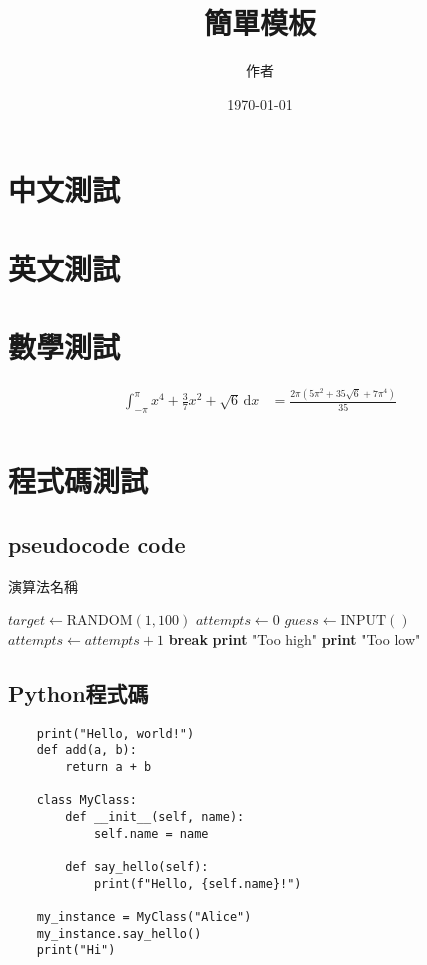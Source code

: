 \documentclass[12pt]{article}
\title{簡單模板}
\author{作者}
\date{\today}
\begin{document}
\maketitle
\tableofcontents

\section{中文測試}
\zhlipsum[1]
\section{英文測試}
\lipsum[1]
\section{數學測試}
\begin{align}
	\int_{-\pi }^{\pi } x^{4} + \frac{3}{7}x^2 + \sqrt{6}   \,\mathrm{d}x & = \frac{2 \pi (5 \pi^{2} + 35 \sqrt{6} + 7 \pi^{4})}{35} \\
\end{align}
\section{程式碼測試}
\subsection{pseudocode code}
\begin{algorithm}
	\caption{演算法名稱}
	\begin{algorithmic}[1]
		\State \(target \gets \text{RANDOM}(1, 100) \)
		\State \(attempts \gets 0\)
		\State \(guess \gets \text{INPUT}() \)
		\State \(attempts \gets attempts + 1\)
		\State \textbf{break}
		\State \textbf{print} "Too high"
		\Else
		\State \textbf{print} "Too low"
		\EndIf
		\EndWhile
	\end{algorithmic}
\end{algorithm}

\subsection{Python程式碼}
\begin{verbatim}
    print("Hello, world!")
    def add(a, b):
        return a + b

    class MyClass:
        def __init__(self, name):
            self.name = name

        def say_hello(self):
            print(f"Hello, {self.name}!")

    my_instance = MyClass("Alice")
    my_instance.say_hello()
    print("Hi")
\end{verbatim}
\end{document}
